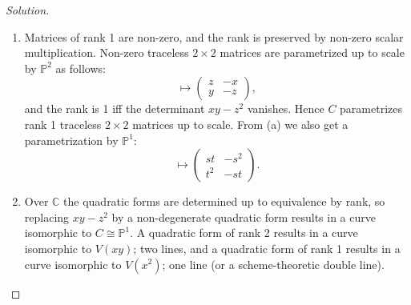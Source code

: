 \documentclass{article}
\theoremstyle{definition}
\renewcommand{\P}{\mathbb{P}}
\newcommand{\C}{\mathbb{C}}
\begin{document}
\begin{enumerate}
\begin{proof}[Solution]
\begin{enumerate}[label=(\alph*)]
                \item Matrices of rank 1 are non-zero, and the rank is preserved
                    by non-zero scalar multiplication. Non-zero traceless
                    $2\times2$ matrices are parametrized up to scale by $\P^2$
                    as follows:
                    \begin{equation*}
                        [x:y:z] \mapsto \begin{pmatrix}
                            z & -x \\ y & -z
                        \end{pmatrix},
                    \end{equation*}
                    and the rank is 1 iff the determinant $xy-z^2$ vanishes.
                    Hence $C$ parametrizes rank 1 traceless $2\times2$ matrices
                    up to scale. From (a) we also get a parametrization by
                    $\P^1$:
                    \begin{equation*}
                        [s:t] \mapsto \begin{pmatrix}
                            st & -s^2 \\ t^2 & -st
                        \end{pmatrix}.
                    \end{equation*}

                \item Over $\C$ the quadratic forms are determined up to
                    equivalence by rank, so replacing $xy-z^2$ by a
                    non-degenerate quadratic form results in a curve isomorphic
                    to $C\cong\P^1$. A quadratic form of rank 2 results in a
                    curve isomorphic to $V(xy)$; two lines, and a quadratic form
                    of rank 1 results in a curve isomorphic to $V(x^2)$; one
                    line (or a scheme-theoretic double line).


\end{enumerate}
\end{proof}
\end{enumerate}
\end{document}
